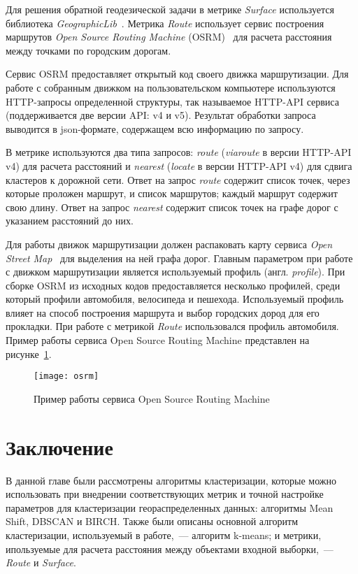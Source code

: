 Для решения обратной геодезической задачи в метрике \emph{Surface} используется библиотека \emph{GeographicLib}~\cite{geographiclib}. Метрика \emph{Route} использует сервис построения маршрутов \emph{Open Source Routing Machine} (OSRM)~\cite{OSRM} для расчета расстояния между точками по городским дорогам.

Сервис OSRM предоставляет открытый код своего движка маршрутизации. Для работе с собранным движком на пользовательском компьютере используются HTTP-запросы определенной структуры, так называемое HTTP-API сервиса (поддерживается две версии API: v4 и v5). Результат обработки запроса выводится в json-формате, содержащем всю информацию по запросу.

В метрике используются два типа запросов: \emph{route} (\emph{viaroute} в версии HTTP-API v4) для расчета расстояний и \emph{nearest} (\emph{locate} в версии HTTP-API v4) для сдвига кластеров к дорожной сети. Ответ на запрос \emph{route} содержит список точек, через которые проложен маршрут, и список маршрутов; каждый маршрут содержит свою длину. Ответ на запрос \emph{nearest} содержит список точек на графе дорог с указанием расстояний до них.

Для работы движок маршрутизации должен распаковать карту сервиса \emph{Open Street Map}~\cite{OSM} для выделения на ней графа дорог. Главным параметром при работе с движком маршрутизации является используемый профиль (англ. \emph{profile}). При сборке OSRM из исходных кодов предоставляется несколько профилей, среди который профили автомобиля, велосипеда и пешехода. Используемый профиль влияет на способ построения маршрута и выбор городских дород для его прокладки. При работе с метрикой \emph{Route} использовался профиль автомобиля. Пример работы сервиса Open Source Routing Machine представлен на рисунке~\ref{pic:osrm}.

\begin{figure}[ht!]
    \centering
    \texttt{[image: osrm]}\\[1ex]
    \parbox{.9\textwidth}{\caption{Пример работы сервиса Open Source Routing Machine~\cite{OSRM}}\label{pic:osrm}}
\end{figure}

\section{Заключение}
В данной главе были рассмотрены алгоритмы кластеризации, которые можно использовать при внедрении соответствующих метрик и точной настройке параметров для кластеризации геораспределенных данных: алгоритмы Mean Shift, DBSCAN и BIRCH. Также были описаны основной алгоритм кластеризации, используемый в работе,~--- алгоритм k-means; и метрики, ипользуемые для расчета расстояния между объектами входной выборки,~--- \emph{Route} и \emph{Surface}.
